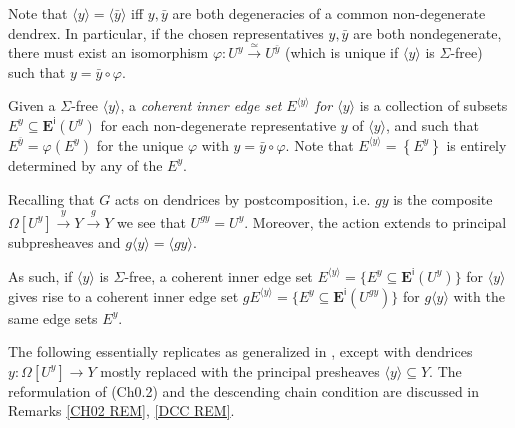 \documentclass[a4paper,10pt
,draft
]{article}%
\renewcommand{\1}{\eta}%
\begin{document}
\begin{remark}
Note that
$\langle y \rangle = \langle \bar{y} \rangle$
iff $y,\bar{y}$ are both degeneracies of a common non-degenerate dendrex.
In particular, if the chosen representatives $y,\bar{y}$ are both nondegenerate,
there must exist an isomorphism
$\varphi \colon U^y \xrightarrow{\simeq} U^{\bar{y}}$
(which is unique if 
$\langle y \rangle$ is $\Sigma$-free)
such that $y= \bar{y} \circ \varphi$.

\end{remark}


\begin{notation}
Given a $\Sigma$-free $\langle y \rangle$,
a \emph{coherent inner edge set $E^{\langle y \rangle}$ for $\langle y \rangle$}
is a collection of subsets 
$E^y \subseteq \boldsymbol{E}^{\mathsf{i}}(U^y)$
for each non-degenerate representative $y$ of $\langle y \rangle$, and such that 
$E^{\bar{y}}  = \varphi \left(E^y \right)$
for the unique $\varphi$ with $y= \bar{y} \circ \varphi$.
Note that $E^{\langle y \rangle} = \left\{E^y \right\}$
is entirely determined by any of the $E^y$.
%
\end{notation}


\begin{remark}
Recalling that $G$ acts on dendrices by postcomposition, i.e.
$gy$ is the composite
$\Omega[U^y] \xrightarrow{y} Y \xrightarrow{g} Y$
we see that $U^{gy} = U^{y}$.
Moreover, the action extends to principal subpresheaves and
$g \langle y \rangle = \langle g y \rangle$.

As such, if $\langle y\rangle$ is $\Sigma$-free, a coherent inner edge set 
$E^{\langle y \rangle} = \{E^y \subseteq \boldsymbol{E}^{\mathsf{i}}(U^y)\}$
for $\langle y \rangle$
gives rise to a coherent inner edge set 
$g E^{\langle y \rangle} = \{E^y \subseteq \boldsymbol{E}^{\mathsf{i}}(U^{gy})\}$
for $g\langle y \rangle$
with the same edge sets $E^y$.
\end{remark}



The following essentially replicates \cite[Def. 3.1]{BP_edss} as generalized in \cite[Rem. 3.7]{BP_edss},
except with dendrices
$y \colon \Omega[U^y] \to Y$
mostly replaced with the principal presheaves
$\langle y \rangle \subseteq Y$. 
The reformulation of (Ch0.2) and the descending chain condition
are discussed in Remarks \ref{CH02 REM}, \ref{DCC REM}.
\end{document}
